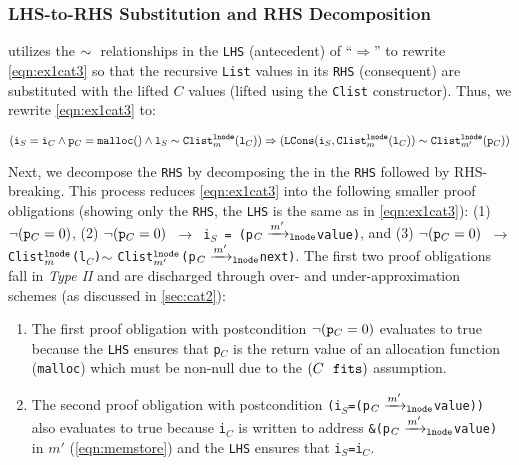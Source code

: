 \subsubsection{LHS-to-RHS Substitution and RHS Decomposition}
\toolName{} utilizes
the $\sim{}$ relationships in the {\tt LHS} (antecedent) of ``$\Rightarrow$''
to rewrite \cref{eqn:ex1cat3}
so that the recursive {\tt List} values in its {\tt RHS} (consequent)
are substituted with the lifted $C$ values (lifted using
the {\tt Clist} constructor). Thus, we
rewrite \cref{eqn:ex1cat3} to:
\vspace{-5px}
\begin{small}
\begin{equation}\label{eqn:ex2cat3}
({\tt i}_S={\tt i}_C \land {\tt p}_C={\tt malloc()} \land {\tt l}_S \sim{} {\tt Clist}_m^{{\tt lnode}}({\tt l}_C)) \Rightarrow ({\tt LCons}({\tt i}_S, {\tt Clist}_m^{{\tt lnode}}({\tt l}_C)) \sim{} {\tt Clist}_{m'}^{{\tt lnode}}({\tt p}_C))
\end{equation}
\end{small}
Next, we decompose the {\tt RHS} by decomposing the \recursiveRelation{} in the {\tt RHS}
followed by RHS-breaking. This process reduces \cref{eqn:ex1cat3} into the following
smaller proof obligations (showing only the
{\tt RHS}, the {\tt LHS} is the same as in \cref{eqn:ex1cat3}):
(1) $\neg({\tt p}_C=0)$,
(2) {\tt $\neg({\tt p}_C=0)$ $\rightarrow$ i$_S$\ =\ (p$_C\xrightarrow[]{m'}_{\mathrm{\tt lnode}}$value)}, and
(3) {\tt $\neg({\tt p}_C=0)$ $\rightarrow$ Clist$_{m}^{{\tt lnode}}$(l$_C$)$\sim{}$Clist$_{m'}^{{\tt lnode}}$(p$_C\xrightarrow[]{m'}_{\mathrm{\tt lnode}}$next)}.
The first two proof obligations fall in {\em Type II} and
are discharged through over- and under-approximation schemes (as discussed
in \cref{sec:cat2}):
\begin{enumerate}
\item The first proof obligation with
postcondition $\neg({\tt p}_C=0)$
evaluates to true because the {\tt LHS} ensures that {\tt p$_C$} is the
return value of an allocation function ({\tt malloc}) which must be
non-null due to the $(C\ \  \mathrm{\tt fits})$ assumption.
\item The second proof obligation with
postcondition {\tt (i$_S$=(p$_C\xrightarrow[]{m'}_{\mathrm{\tt lnode}}$value))}
also evaluates to true because {\tt i$_C$} is written to address {\tt \&(p$_C\xrightarrow[]{m'}_{\mathrm{\tt lnode}}$value)}
in $m'$ (\cref{eqn:memstore}) and the {\tt LHS} ensures that {\tt i$_S$=i$_C$}.
\end{enumerate}


